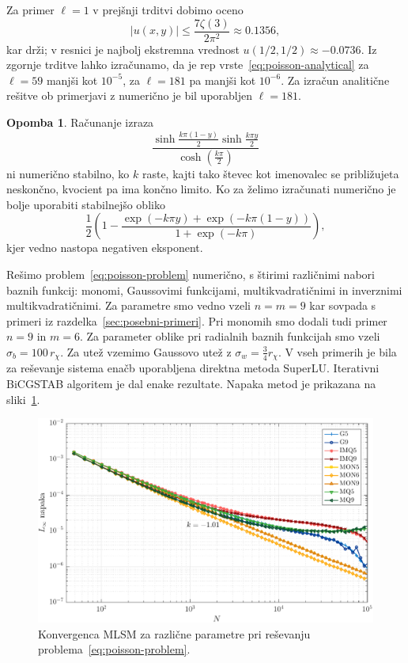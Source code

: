 \documentclass[a4paper,twoside]{article}
\theoremstyle{definition} %
\newtheorem{opomba}[definicija]{Opomba}
\theoremstyle{plain} %
\numberwithin{equation}{section}
\newlength{\iw}
\begin{document}
\endproof
Za primer $\ell = 1$  v prejšnji trditvi dobimo oceno
\[
  |u(x, y)| \leq \frac{7 \zeta(3)}{2 \pi^2} \approx 0.1356,
\]
kar drži; v resnici je najbolj ekstremna vrednost $u(1/2, 1/2) \approx -0.0736$.
Iz zgornje trditve lahko izračunamo, da je rep
vrste~\eqref{eq:poisson-analytical} za $\ell = 59$ manjši kot $10^{-5}$, za
$\ell = 181$ pa manjši kot $10^{-6}$.  Za izračun analitične rešitve ob
primerjavi z numerično je bil uporabljen $\ell = 181$.
\begin{opomba}
  Računanje izraza \[
    \frac{\sinh \frac{k \pi  (1-y)}{2} \sinh \frac{k \pi
    y}{2}}{\cosh(\frac{k\pi}{2})}
  \] ni numerično stabilno, ko $k$ raste, kajti tako števec kot imenovalec se
  približujeta neskončno, kvocient pa ima končno limito. Ko za želimo izračunati
  numerično je bolje uporabiti stabilnejšo obliko
  \[
    \frac12\left( 1 - \frac{\exp(-k\pi y) + \exp(-k\pi(1-y)) }{1 +
    \exp(-k\pi)}\right),
  \]
  kjer vedno nastopa negativen eksponent.
\end{opomba}

Rešimo problem~\eqref{eq:poisson-problem} numerično, s štirimi različnimi nabori
baznih funkcij: monomi, Gaussovimi funkcijami, multikvadratičnimi in inverznimi
multikvadratičnimi. Za parametre smo vedno vzeli $n = m = 9$
kar sovpada s primeri iz razdelka~\ref{sec:posebni-primeri}. Pri monomih smo
dodali tudi primer $n = 9$ in $m = 6$. Za parameter oblike
pri radialnih baznih funkcijah smo vzeli $\sigma_b = 100\, r_\chi$.
Za utež vzemimo Gaussovo utež z $\sigma_w = \frac34 r_\chi$.
V vseh primerih je bila za reševanje sistema enačb uporabljena direktna metoda
SuperLU. Iterativni BiCGSTAB algoritem je dal enake rezultate.  Napaka metod je
prikazana na sliki~\ref{fig:poisson-square-convergence}.

\begin{figure}[h]
  \centering
  \includegraphics[width=\iw]{images/poisson_square_convergence.pdf}
  \caption{Konvergenca MLSM za različne parametre pri reševanju problema~\eqref{eq:poisson-problem}.}
  \label{fig:poisson-square-convergence}
\end{figure}
\end{document}
